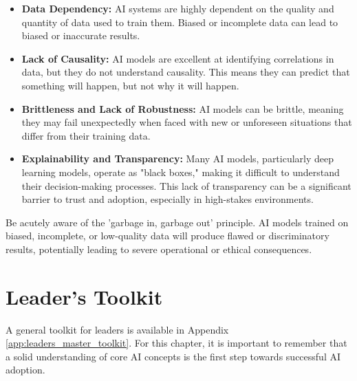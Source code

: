 \begin{itemize}
    \item \textbf{Data Dependency:} AI systems are highly dependent on the quality and quantity of data used to train them. Biased or incomplete data can lead to biased or inaccurate results.
    \item \textbf{Lack of Causality:} AI models are excellent at identifying correlations in data, but they do not understand causality. This means they can predict that something will happen, but not why it will happen.
    \item \textbf{Brittleness and Lack of Robustness:} AI models can be brittle, meaning they may fail unexpectedly when faced with new or unforeseen situations that differ from their training data.
    \item \textbf{Explainability and Transparency:} Many AI models, particularly deep learning models, operate as "black boxes," making it difficult to understand their decision-making processes. This lack of transparency can be a significant barrier to trust and adoption, especially in high-stakes environments.
\end{itemize}

\begin{warningbox}
Be acutely aware of the 'garbage in, garbage out' principle. AI models trained on biased, incomplete, or low-quality data will produce flawed or discriminatory results, potentially leading to severe operational or ethical consequences.
\end{warningbox}

\section{Leader's Toolkit}
\label{sec:core_ai_leaders_toolkit}

A general toolkit for leaders is available in Appendix \ref{app:leaders_master_toolkit}. For this chapter, it is important to remember that a solid understanding of core AI concepts is the first step towards successful AI adoption.
